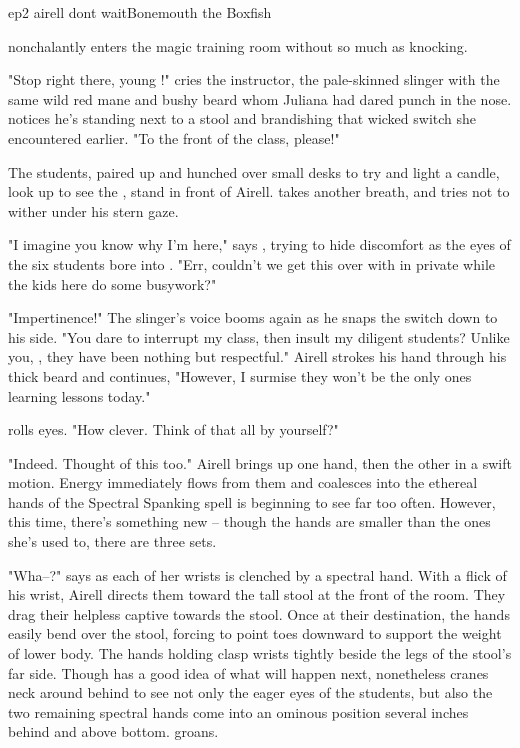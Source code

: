 \documentclass{book}
\begin{document}
\begin{childnode}{ep2 airell dont wait}{Bonemouth the Boxfish}

    \name{} nonchalantly enters the magic training room without so much as knocking. 

    "Stop right there, young \manlady{}!" cries the instructor, the pale-skinned slinger with the same wild red mane and bushy beard whom Juliana had dared punch in the nose. \name{} notices he's 
    standing next to a stool and brandishing that wicked switch she encountered earlier. "To the front of the class, please!"
    
    The students, paired up and hunched over small desks to  try and light a candle, look up to see the ,  
    \boygirl{} 
    stand in front of Airell. \name{} takes another breath, and tries not to wither under his stern gaze. 
    
    "I imagine you know why I'm here," says \name{}, trying to hide \hisher{} discomfort as the eyes of the six students bore into \himher{}. "Err, couldn't we get this over with in private while 
    the kids here do some busywork?"
    
"Impertinence!" The slinger's voice booms again as he snaps the switch down to his side. "You dare to interrupt my class, then insult my diligent students? Unlike you, 
\boygirl{}, they have been nothing but respectful." Airell strokes his hand through his thick beard and continues, "However, I surmise they won't be the only ones learning lessons today." 

\name{} rolls \hisher{} eyes. "How clever. Think of that all by yourself?"

"Indeed. Thought of this too." Airell brings up one hand, then the other in a swift motion. Energy immediately flows from them and coalesces into the ethereal hands of the Spectral Spanking spell 
\name{} is beginning to see far too often. However, this time, there's something new -- though the hands are smaller than the ones she's used to, there are three sets. 

"Wha--?" says \name{} as each of her wrists is clenched by a spectral hand. With a flick of his wrist, Airell directs them toward the tall stool at the front of the room. 
They drag their helpless captive towards the stool. Once at their destination, the hands easily bend \name{} over the stool,  forcing \name{} to point \hisher{} toes downward to support the weight of \hisher{} lower body. The
hands holding \himher{}
clasp \hisher{} wrists tightly beside the legs of the stool's far side. Though \heshe{} has a good idea of what will happen next, \name{} nonetheless cranes \hisher{} neck around behind \himher{} 
to see not only the eager eyes of the students, but also the two remaining spectral hands come into an ominous position several inches behind and above \hisher{} bottom. \HeShe{} groans.


\end{childnode}
\end{document}
